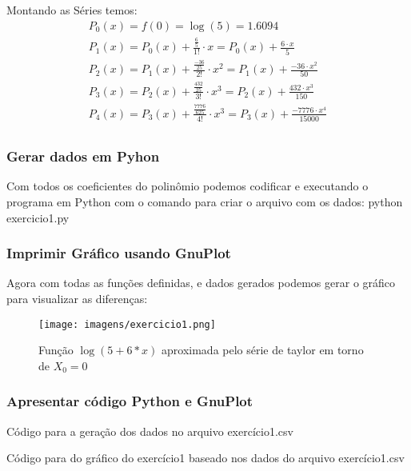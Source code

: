 Montando as Séries temos:
    \begin{gather*}
        P_0 (x) = f(0) = \log(5) = 1.6094\\
        P_1 (x) = P_0(x) + \frac{\frac{6}{5}}{1!} \cdot x = P_0(x) + \frac{6 \cdot x}{5} \\
        P_2 (x) = P_1(x) + \frac{\frac{-36}{25}}{2!} \cdot x^2 = P_1(x) + \frac{-36 \cdot x^2}{50} \\
        P_3 (x) = P_2(x) + \frac{\frac{432}{25}}{3!} \cdot x^3 = P_2(x) + \frac{432 \cdot x^3}{150} \\
        P_4 (x) = P_3(x) + \frac{\frac{7776}{625}}{4!} \cdot x^3 = P_3(x) + \frac{-7776 \cdot x^4}{15000} \\
    \end{gather*}

\subsubsection{Gerar dados em Pyhon}

Com todos os coeficientes do polinômio podemos codificar e executando o programa em Python com o comando para criar o arquivo com os dados: python exercicio1.py


\subsubsection{Imprimir Gráfico usando GnuPlot}

Agora com todas as funções definidas, e dados gerados podemos gerar o gráfico para visualizar as diferenças:

\begin{figure}[htbp]
    \centering
    \texttt{[image: imagens/exercicio1.png]}
    \caption{Função $\log(5+6*x)$ aproximada pelo série de taylor em torno de $X_0=0$}
    \label{fig:grafico}
\end{figure}

\newpage

\subsubsection{Apresentar código Python e GnuPlot}


Código para a geração dos dados no arquivo exercício1.csv
\newpage


Código para do gráfico do exercício1 baseado nos dados do arquivo exercício1.csv

\newpage





